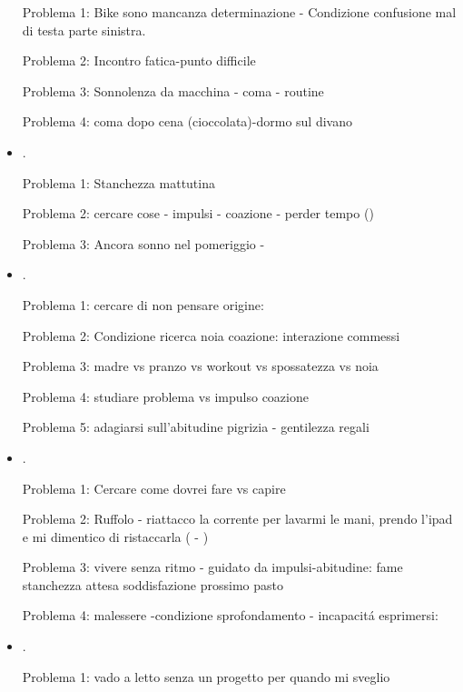 \begin{itemize}
Problema 1: Bike sono mancanza determinazione - Condizione confusione mal di testa parte sinistra.

Problema 2: Incontro fatica-punto difficile

Problema 3: Sonnolenza da macchina - coma - routine

Problema 4: coma dopo cena (cioccolata)-dormo sul divano

\item {}.

Problema 1: Stanchezza mattutina

Problema 2: cercare cose - impulsi - coazione - perder tempo ()

Problema 3: Ancora sonno nel pomeriggio - 

\item {}.

Problema 1: cercare di non pensare origine: 

Problema 2: Condizione ricerca noia coazione: interazione commessi

Problema 3: madre vs pranzo vs workout vs spossatezza vs noia

Problema 4: studiare problema vs impulso coazione

Problema 5: adagiarsi sull'abitudine pigrizia - gentilezza regali

\item {}.

Problema 1: Cercare come dovrei fare vs capire

Problema 2: Ruffolo - riattacco la corrente per lavarmi le mani, prendo l'ipad e mi dimentico di ristaccarla ( - )

Problema 3: vivere senza ritmo - guidato da impulsi-abitudine: fame stanchezza attesa soddisfazione prossimo pasto

Problema 4: malessere -condizione sprofondamento - incapacit\'a esprimersi: 

\item {}.

Problema 1: vado a letto senza un progetto per quando mi sveglio


\end{itemize}
